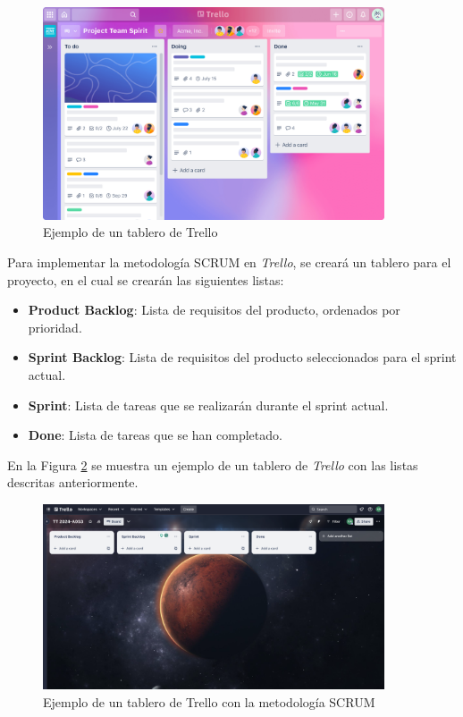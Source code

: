 \begin{figure}[!htbp]
  \centering
  \includegraphics[width=0.9\textwidth]{imagenes/01-introduccion/trello-board.png}
  \caption[Ejemplo de un tablero de Trello]{Ejemplo de un tablero de Trello \cite{trello2023}}
  \label{fig:trello}
\end{figure}

Para implementar la metodología SCRUM en \textit{Trello}, se creará un tablero
para el proyecto, en el cual se crearán las siguientes listas:

\begin{itemize}
  \item \textbf{Product Backlog}: Lista de requisitos del producto, ordenados
  por prioridad.
  \item \textbf{Sprint Backlog}: Lista de requisitos del producto seleccionados
  para el sprint actual.
  \item \textbf{Sprint}: Lista de tareas que se realizarán durante el sprint
  actual.
  \item \textbf{Done}: Lista de tareas que se han completado.
\end{itemize}

En la Figura \ref{fig:trello_scrum} se muestra un ejemplo de un tablero de
\textit{Trello} con las listas descritas anteriormente.

\begin{figure}[!htbp]
  \centering
  \includegraphics[width=0.9\textwidth]{imagenes/01-introduccion/trello-scrum.png}
  \caption[Ejemplo de un tablero de Trello con la metodología SCRUM]{Ejemplo de un tablero de Trello con la metodología SCRUM}
  \label{fig:trello_scrum}
\end{figure}

